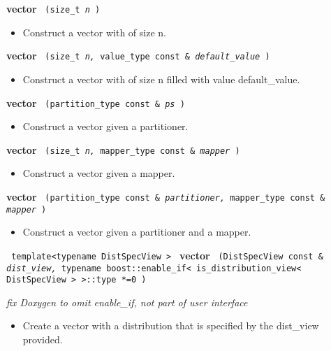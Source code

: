 \noindent
\textbf{vector}%
\texttt{%
(size\_t
\textit{n}%
)
}

\begin{itemize}
\item
Construct a vector with of size n. 
\end{itemize}
 
\noindent
\textbf{vector}%
\texttt{%
(size\_t
\textit{n,}%
value\_type const \&
\textit{default\_value}%
)
}

\begin{itemize}
\item
Construct a vector with of size n filled with value default\_value. 
\end{itemize}
 
\noindent
\textbf{vector}%
\texttt{%
(partition\_type const \&
\textit{ps}%
)
}

\begin{itemize}
\item
Construct a vector given a partitioner. 
\end{itemize}
 
\noindent
\textbf{vector}%
\texttt{%
(size\_t 
\textit{n,}%
mapper\_type const \&
\textit{mapper}%
)
}

\begin{itemize}
\item
Construct a vector given a mapper. 
\end{itemize}
 
\noindent
\textbf{vector}%
\texttt{%
(partition\_type const \&
\textit{partitioner,}%
mapper\_type const \&
\textit{mapper}%
)
}

\begin{itemize}
\item
Construct a vector given a partitioner and a mapper. 
\end{itemize}
 
\noindent
\texttt{%
template<typename DistSpecView >
}
\newline
\textbf{vector}%
\texttt{%
(DistSpecView const \&
\textit{dist\_view,}%
typename boost::enable\_if< is\_distribution\_view< DistSpecView > >::type *=0
)
}

\vspace{0.4cm} \emph{fix Doxygen to omit enable\_if, not part of user interface}

\begin{itemize}
\item
Create a vector with a distribution that is specified by the dist\_view provided. 
\end{itemize}
 
